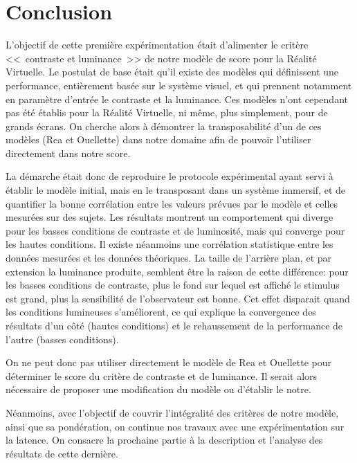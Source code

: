 \chapter*{Conclusion}
\par L'objectif de cette première expérimentation était d'alimenter le critère <<~contraste et luminance~>> de notre modèle de score pour la Réalité Virtuelle. Le postulat de base était qu'il existe des modèles qui définissent une performance, entièrement basée sur le système visuel, et qui prennent notamment en paramètre d'entrée le contraste et la luminance. Ces modèles n'ont cependant pas été établis pour la Réalité Virtuelle, ni même, plus simplement, pour de grands écrans. On cherche alors à démontrer la transposabilité d'un de ces modèles (Rea et Ouellette) dans notre domaine afin de pouvoir l'utiliser directement dans notre score.

\par La démarche était donc de reproduire le protocole expérimental ayant servi à établir le modèle initial, mais en le transposant  dans un système immersif, et de quantifier la bonne corrélation entre les valeurs prévues par le modèle et celles mesurées sur des sujets. Les résultats montrent un comportement qui diverge pour les basses conditions de contraste et de luminosité, mais qui converge pour les hautes conditions. Il existe néanmoins une corrélation statistique entre les données mesurées et les données théoriques. La taille de l'arrière plan, et par extension la luminance produite, semblent être la raison de cette différence: pour les basses conditions de contraste, plus le fond sur lequel est affiché le stimulus est grand, plus la sensibilité de l'observateur est bonne. Cet effet disparait quand les conditions lumineuses s'améliorent, ce qui explique la convergence des résultats d'un côté (hautes conditions) et le rehaussement de la performance de l'autre (basses conditions).

\par On ne peut donc pas utiliser directement le modèle de Rea et Ouellette pour déterminer le score du critère de contraste et de luminance. Il serait alors nécessaire de proposer une modification du modèle ou d'établir le notre.

\par Néanmoins, avec l'objectif de couvrir l'intégralité des critères de notre modèle, ainsi que sa pondération, on continue nos travaux avec une expérimentation sur la latence. On consacre la prochaine partie à la description et l'analyse des résultats de cette dernière.
